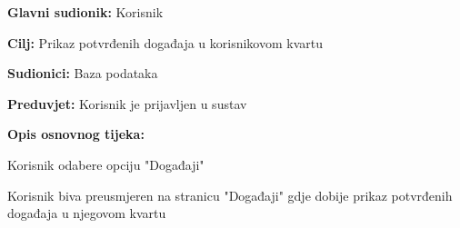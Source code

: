 					\noindent {}
					\begin{packed_item}
	
						\item \textbf{Glavni sudionik: }Korisnik
						\item  \textbf{Cilj:} Prikaz potvrđenih događaja u korisnikovom kvartu
						\item  \textbf{Sudionici:} Baza podataka
						\item  \textbf{Preduvjet:} Korisnik je prijavljen u sustav
						\item  \textbf{Opis osnovnog tijeka:}
						
						\item[] \begin{packed_enum}
	
							\item Korisnik odabere opciju "Događaji"
							\item Korisnik biva preusmjeren na stranicu "Događaji" gdje dobije prikaz potvrđenih događaja u njegovom kvartu
						\end{packed_enum}
						
							
						\end{packed_item}
					\noindent {}
